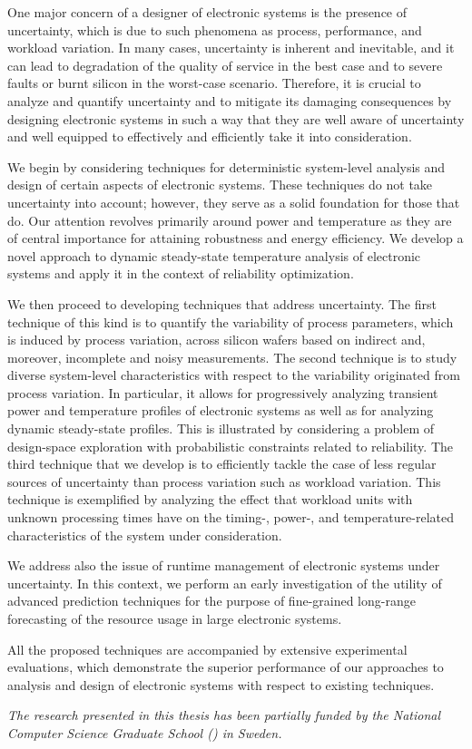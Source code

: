 One major concern of a designer of electronic systems is the presence of
uncertainty, which is due to such phenomena as process, performance, and
workload variation. In many cases, uncertainty is inherent and inevitable, and
it can lead to degradation of the quality of service in the best case and to
severe faults or burnt silicon in the worst-case scenario. Therefore, it is
crucial to analyze and quantify uncertainty and to mitigate its damaging
consequences by designing electronic systems in such a way that they are well
aware of uncertainty and well equipped to effectively and efficiently take it
into consideration.

We begin by considering techniques for deterministic system-level analysis and
design of certain aspects of electronic systems. These techniques do not take
uncertainty into account; however, they serve as a solid foundation for those
that do. Our attention revolves primarily around power and temperature as they
are of central importance for attaining robustness and energy efficiency. We
develop a novel approach to dynamic steady-state temperature analysis of
electronic systems and apply it in the context of reliability optimization.

We then proceed to developing techniques that address uncertainty. The first
technique of this kind is to quantify the variability of process parameters,
which is induced by process variation, across silicon wafers based on indirect
and, moreover, incomplete and noisy measurements. The second technique is to
study diverse system-level characteristics with respect to the variability
originated from process variation. In particular, it allows for progressively
analyzing transient power and temperature profiles of electronic systems as well
as for analyzing dynamic steady-state profiles. This is illustrated by
considering a problem of design-space exploration with probabilistic constraints
related to reliability. The third technique that we develop is to efficiently
tackle the case of less regular sources of uncertainty than process variation
such as workload variation. This technique is exemplified by analyzing the
effect that workload units with unknown processing times have on the timing-,
power-, and temperature-related characteristics of the system under
consideration.

We address also the issue of runtime management of electronic systems under
uncertainty. In this context, we perform an early investigation of the utility
of advanced prediction techniques for the purpose of fine-grained long-range
forecasting of the resource usage in large electronic systems.

All the proposed techniques are accompanied by extensive experimental
evaluations, which demonstrate the superior performance of our approaches to
analysis and design of electronic systems with respect to existing techniques.

\vspace{1em}
\noindent
\emph{
  The research presented in this thesis has been partially funded by the
  National Computer Science Graduate School () in Sweden.
}
